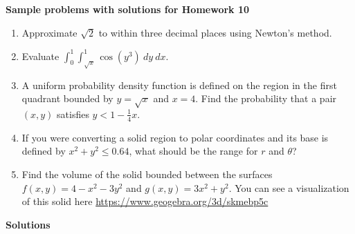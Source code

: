 \documentclass{article}
\begin{document}
\begin{center}
\textbf{
    Sample problems with solutions for Homework 10}
\end{center}
    \begin{enumerate}
        \item Approximate $\sqrt{2}$ to within three decimal places using Newton's method.
        \item Evaluate $\int_0^1 \int_{\sqrt{x}}^{1} \cos(y^3)\ dy\ dx$.
        \item A uniform probability density function is defined on the region in the first quadrant bounded by $y=\sqrt{x}$ and $x=4$. Find the probability that a pair $(x,y)$ satisfies $y<1-\frac{1}{4}x$.
        \item If you were converting a solid region to polar coordinates and its base is defined by $x^2+y^2\leq 0.64$, what should be the range for $r$ and $\theta$?
        \item Find the volume of the solid bounded between the surfaces $f(x,y) = 4-x^2-3y^2$ and $g(x,y) = 3x^2+y^2$. You can see a visualization of this solid here \url{https://www.geogebra.org/3d/skmebp5c}
        
    \end{enumerate}
    \begin{center}
        \textbf{\Large{Solutions}}
    \end{center}
\end{document}
